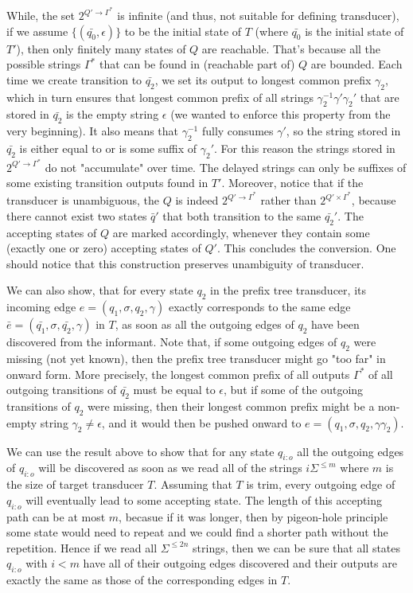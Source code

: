 While, the set $2^{Q'\rightarrow\Gamma^*}$ is infinite (and thus, not suitable for defining transducer), if we assume $\{(\bar{q_0},\epsilon)\}$ to be the initial state of $T$ (where $\bar{q_0}$ is the initial state of $T'$), then only finitely many states of $Q$ are reachable. That's because all the possible strings $\Gamma^*$ that can be found in (reachable part of) $Q$ are bounded. Each time we create transition to $\bar{q_2}$, we set its output to longest common prefix $\gamma_2$, which in turn ensures that longest common prefix of all strings $\gamma_2^{-1}\gamma'\gamma_2'$ that are stored in $\bar{q_2}$ is the empty string $\epsilon$ (we wanted to enforce this property from the very beginning). It also means that $\gamma_2^{-1}$ fully consumes $\gamma'$, so the string stored in $\bar{q_2}$ is either equal to or is some suffix of $\gamma_2'$. For this reason the strings stored in $2^{Q'\rightarrow\Gamma^*}$  do not "accumulate" over time. The delayed strings can only be suffixes of some existing transition outputs found in $T'$.  Moreover, notice that if the transducer is unambiguous, the $Q$ is indeed $2^{Q'\rightarrow\Gamma^*}$ rather than $2^{Q'\times\Gamma^*}$, because there cannot exist two states $\bar{q}'$ that both transition to the same $\bar{q_2}'$. The accepting states of $Q$ are marked accordingly, whenever they contain some (exactly one or zero) accepting states of $Q'$.  This concludes the conversion. One should notice that this construction preserves unambiguity of transducer. 

We can also show, that for every state $q_2$ in the prefix tree transducer, its incoming edge $e=(q_1,\sigma,q_2,\gamma)$ exactly corresponds to the same edge $\bar{e}=(\bar{q_1},\sigma,\bar{q_2},\gamma)$ in $T$, as soon as all the outgoing edges of $q_2$ have been discovered from the informant. Note that, if some outgoing edges of $q_2$ were missing (not yet known), then the prefix tree transducer might go "too far" in onward form. More precisely, the longest common prefix of all outputs $\Gamma^*$ of all outgoing transitions of $\bar{q_2}$ must be equal to $\epsilon$, but if some of the outgoing transitions of $q_2$ were missing, then their longest common prefix might be a non-empty string $\gamma_2\ne\epsilon$, and it would then be pushed onward to $e=(q_1,\sigma,q_2,\gamma\gamma_2)$. 

We can use the result above to show that for any state $q_{i:o}$ all the outgoing edges of $q_{i:o}$ will be discovered as soon as we read all of the strings $i\Sigma^{\le m}$ where $m$ is the size of target transducer $T$. Assuming that $T$ is trim, every outgoing edge of $q_{i:o}$ will eventually lead to some accepting state. The length of this accepting path can be at most $m$, becasue if it was longer, then by pigeon-hole principle some state would need to repeat and we could find a shorter path without the repetition. Hence if we read all $\Sigma^{\le 2n}$ strings, then we can be sure that all states $q_{i:o}$ with $i<m$ have all of their outgoing edges discovered and their outputs are exactly the same as those of the corresponding edges in $T$.



